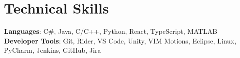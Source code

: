 \section{Technical Skills}
 \begin{itemize}[leftmargin=0.15in, label={}]
    \small{\item{
     \textbf{Languages}{: C\#, Java, C/C++, Python, React, TypeScript, MATLAB} \\
     \textbf{Developer Tools}{: Git, Rider, VS Code, Unity, VIM Motions, Eclipse, Linux, PyCharm, Jenkins, GitHub, Jira} \\
    }}
 \end{itemize}
